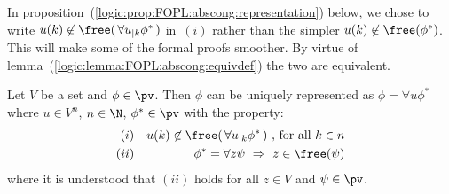 In proposition~(\ref{logic:prop:FOPL:abscong:representation}) below,
we chose to write $u(k)\not\in\free(\,\forall u_{|k}\phi^{*}\,)$
in~$(i)$ rather than the simpler $u(k)\not\in\free(\phi^{*})$. This
will make some of the formal proofs smoother. By virtue of
lemma~(\ref{logic:lemma:FOPL:abscong:equivdef}) the two are
equivalent.

\begin{prop}\label{logic:prop:FOPL:abscong:representation}
Let $V$ be a set and $\phi\in\pv$. Then $\phi$ can be uniquely
represented as $\phi=\forall u\phi^{*}$ where $u\in V^{n}$,
$n\in\N$, $\phi^{*}\in\pv$ with the property:
    \begin{eqnarray*}
    (i)&& u(k)\not\in\free(\,\forall u_{|k}\phi^{*}\,)\mbox{\ ,\ for all $k\in n$}\\
    (ii)&& \phi^{*}=\forall z\psi\ \Rightarrow\
    z\in\free(\psi)
    \end{eqnarray*}
where it is understood that $(ii)$ holds for all $z\in V$ and
$\psi\in\pv$.
\end{prop}
